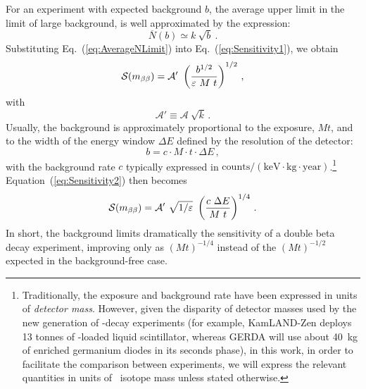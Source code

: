\documentclass{PoS}
\begin{document}
For an experiment with expected background $b$, the average upper limit in the limit of large background, is well approximated  by the expression:
\begin{equation}
\overline{N}(b) \simeq k~\sqrt{b}\ . \label{eq:AverageNLimit}
\end{equation}
Substituting Eq.~(\ref{eq:AverageNLimit}) into Eq.~(\ref{eq:Sensitivity1}), we obtain
\begin{equation}
\mathcal{S}(\mbb) = \mathcal{A}'\ \left(\frac{b^{1/2}}{\varepsilon~M~t}\right)^{1/2}\,, \label{eq:Sensitivity2}
\end{equation}
with
\begin{equation}
\mathcal{A}' \equiv \mathcal{A}\ \sqrt{k}\,.
\end{equation}
Usually, the background is approximately proportional to the exposure, $Mt$, and to the width of the energy window $\Delta E$ defined by the resolution of the detector:
\begin{equation}
b = c \cdot M \cdot t \cdot \Delta E \,,
\end{equation}
with the background rate $c$ typically expressed in $\mathrm{counts}/(\mathrm{keV}\cdot\mathrm{kg}\cdot\mathrm{year})$.\footnote{Traditionally, the exposure and background rate have been expressed in units of \emph{detector mass}. However, given the disparity of detector masses used by the new generation of \bbonu-decay experiments (for example, KamLAND-Zen deploys 13 tonnes of \XE-loaded liquid scintillator, whereas GERDA will use about 40~kg of enriched germanium diodes in its seconds phase), in this work, in order to facilitate the comparison between experiments, we will express the relevant quantities in units of \bb\ isotope mass unless stated otherwise.} Equation~(\ref{eq:Sensitivity2}) then becomes
\begin{equation}
\mathcal{S}(\mbb) = \mathcal{A}'\ \sqrt{1/\varepsilon}\ \left(\frac{c~\Delta E}{M~t}\right)^{1/4}\,. \label{eq:Sensitivity3}
\end{equation}
In short, the background limits dramatically the sensitivity of a double beta decay experiment, improving only as $(Mt)^{-1/4}$ instead of the $(Mt)^{-1/2}$ expected in the background-free case.
\end{document}
